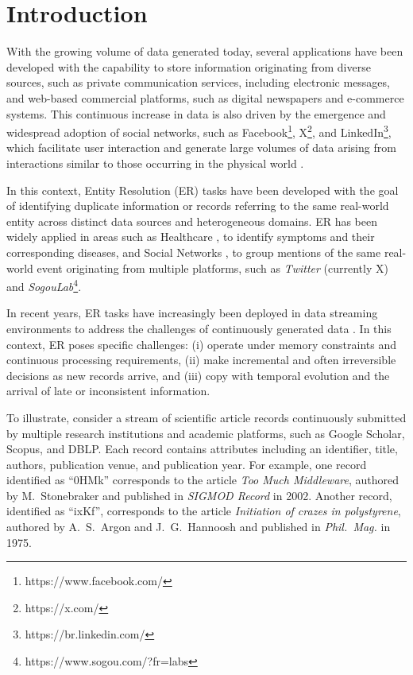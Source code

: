 \documentclass{ieeeaccess}
\begin{document}
\titlepgskip=-15pt
\maketitle
\section{Introduction} \label{sec:introducao}

With the growing volume of data generated today, several applications have been developed with the capability to store information originating from diverse sources, such as private communication services, including electronic messages, and web-based commercial platforms, such as digital newspapers and e-commerce systems. This continuous increase in data is also driven by the emergence and widespread adoption of social networks, such as Facebook\footnote{https://www.facebook.com/}, X\footnote{https://x.com/}, and LinkedIn\footnote{https://br.linkedin.com/}, which facilitate user interaction and generate large volumes of data arising from interactions similar to those occurring in the physical world \cite{10.1111/j.1083-6101.2007.00393.x}.

In this context, Entity Resolution (ER) tasks \cite{christen2012} have been developed with the goal of identifying duplicate information or records referring to the same real-world entity across distinct data sources and heterogeneous domains. ER has been widely applied in areas such as Healthcare \cite{10.1145/3448016.3457238}, to identify symptoms and their corresponding diseases, and Social Networks \cite{doi:10.1504/IJWGS.2017.085167}, to group mentions of the same real-world event originating from multiple platforms, such as \textit{Twitter} (currently X) and \textit{SogouLab}\footnote{https://www.sogou.com/?fr=labs}.

In recent years, ER tasks have increasingly been deployed in data streaming environments to address the challenges of continuously generated data \cite{karapiperis2023, Gazzarri2021, DBLP:conf/edbt/GazzarriH23}. In this context, ER poses specific challenges: (i) operate under memory constraints and continuous processing requirements, (ii) make incremental and often irreversible decisions as new records arrive, and (iii) copy with temporal evolution and the arrival of late or inconsistent information. 

To illustrate, consider a stream of scientific article records continuously submitted by multiple research institutions and academic platforms, such as Google Scholar, Scopus, and DBLP. Each record contains attributes including an identifier, title, authors, publication venue, and publication year. For example, one record identified as ``0HMk'' corresponds to the article \textit{Too Much Middleware}, authored by M.~Stonebraker and published in \textit{SIGMOD Record} in 2002. Another record, identified as ``ixKf'', corresponds to the article \textit{Initiation of crazes in polystyrene}, authored by A.~S.~Argon and J.~G.~Hannoosh and published in \textit{Phil.\ Mag.} in 1975.
\end{document}

